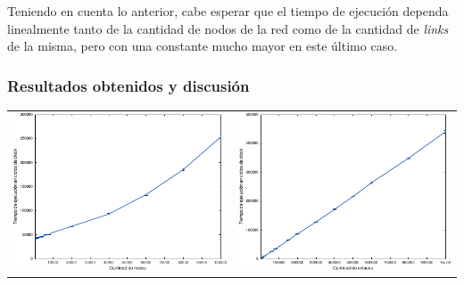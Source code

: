             Teniendo en cuenta lo anterior, cabe esperar que el tiempo de ejecución dependa linealmente tanto de la cantidad de nodos de la red como de la cantidad de \emph{links} de la misma, pero con una constante mucho mayor en este último caso.

            \subsubsection*{Resultados obtenidos y discusión}

            \noindent{} \begin{minipage}{\textwidth}
                \begin{center}
                    \vspace{1em}

                    \begin{tabular}{cc}
                        \includegraphics{graficos/exp1-a.pdf} & \includegraphics{graficos/exp1-b.pdf} \\
                    \end{tabular}


\end{center}
\end{minipage}
